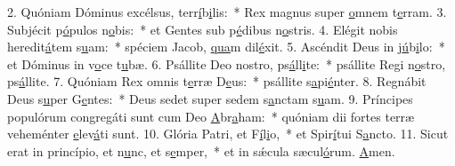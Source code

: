 2. Quóniam Dóminus excélsus, terr\uline{í}b\uline{i}lis:~* Rex magnus super \uline{o}mnem t\uline{e}rram.
3. Subjécit p\uline{ó}pulos n\uline{o}bis:~* et Gentes sub p\uline{é}dibus n\uline{o}stris.
4. Elégit nobis heredit\uline{á}tem s\uline{u}am:~* spéciem Jacob, \uline{qua}m dil\uline{é}xit.
5. Ascéndit Deus in j\uline{ú}b\uline{i}lo:~* et Dóminus in v\uline{o}ce t\uline{u}bæ.
6. Psállite Deo nostro, ps\uline{á}ll\uline{i}te:~* psállite Regi n\uline{o}stro, ps\uline{á}llite.
7. Quóniam Rex omnis t\uline{e}rræ D\uline{e}us:~* psállite s\uline{a}pi\uline{é}nter.
8. Regnábit Deus s\uline{u}per G\uline{e}ntes:~* Deus sedet super sedem s\uline{a}nctam s\uline{u}am.
9. Príncipes populórum congregáti sunt cum Deo \uline{A}br\uline{a}ham:~* quóniam dii fortes terræ veheménter \uline{e}lev\uline{á}ti sunt.
10. Glória Patri, et F\uline{í}l\uline{i}o,~* et Spir\uline{í}tui S\uline{a}ncto.
11. Sicut erat in princípio, et n\uline{u}nc, et s\uline{e}mper,~* et in sǽcula sæcul\uline{ó}rum. \uline{A}men.
